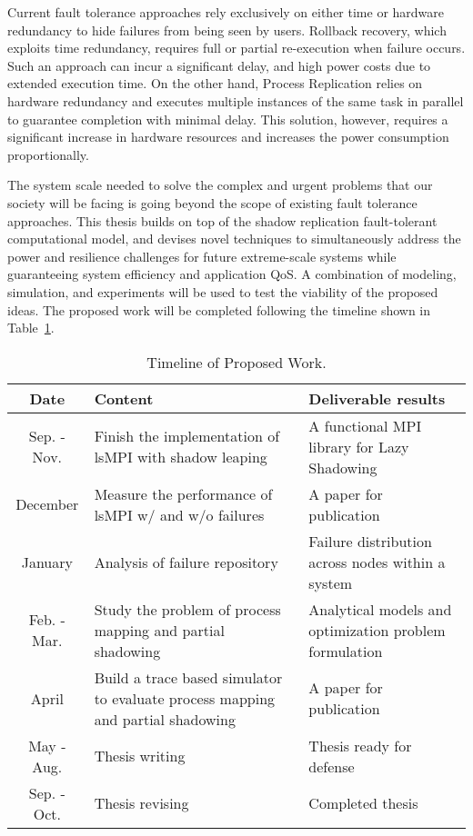 Current fault tolerance approaches rely exclusively on either time or hardware redundancy to hide failures from being seen by users. 
Rollback recovery, which exploits time redundancy, requires full or partial re-execution when failure occurs.  
Such an approach
can incur a significant delay, %
and high power costs due to extended execution time.
On the other hand, Process Replication relies on hardware redundancy and executes multiple
instances of the same task in parallel to guarantee completion with minimal delay. 
This solution, however, requires a significant increase in hardware resources and increases the power consumption proportionally. 

The system scale needed to solve the complex and urgent problems that our society will be facing is going beyond the scope of existing 
fault tolerance approaches. This thesis builds on top of the shadow replication fault-tolerant computational model, and 
devises novel techniques to simultaneously address the power and resilience challenges for future extreme-scale systems while guaranteeing system efficiency and application QoS. 
A combination of modeling, simulation, and experiments will be used to test the viability of the proposed ideas. The proposed work will be completed following the timeline shown in 
Table~\ref{tab:timeline}.


\begin{table}[ht]
\vspace{-0.3in}
\caption{Timeline of Proposed Work.}
\vspace{-0.15in}
\centering
\scalebox{0.85}
{
\begin{tabularx}{\textwidth}{|c|X|X|}
\toprule
\textbf{Date} & \textbf{Content} & \textbf{Deliverable results} \\
\midrule
Sep. - Nov.  & Finish the implementation of lsMPI with shadow leaping & A functional MPI library for Lazy Shadowing \\
\hline
December & Measure the performance of lsMPI w/ and w/o failures & A paper for publication \\
\hline
January & Analysis of failure repository & Failure distribution across nodes within a system \\
\hline
Feb. - Mar.  & Study the problem of process mapping and partial shadowing & Analytical models and optimization problem formulation \\
\hline
April  & Build a trace based simulator to evaluate process mapping and partial shadowing & A paper for publication \\ 
\hline
May - Aug. & Thesis writing & Thesis ready for defense \\
\hline
Sep. - Oct. & Thesis revising & Completed thesis \\ 
\bottomrule
\end{tabularx}
}
\label{tab:timeline}
\end{table}






